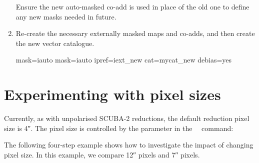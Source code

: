 \begin{enumerate}
  Ensure the new auto-masked co-add is used in place of the old one to
  define any new masks needed in future.

\begin{terminalv}
\end{terminalv}

\item Re-create the necessary externally masked maps and co-adds, and
  then create the new vector catalogue.

\begin{terminalv}
     mask=iauto
     mask=iauto ipref=iext_new cat=mycat_new debias=yes
\end{terminalv}
\end{enumerate}


\section{Experimenting with pixel sizes}

Currently, as with unpolarised SCUBA-2 reductions, the default
reduction pixel size is 4\si{\arcsecond}.  The pixel size is controlled by the
 parameter in the \smurf\ \poltwomap\ command:

\begin{terminalv}
\end{terminalv}


The following four-step example shows how to investigate the impact of
changing pixel size.  In this example, we compare 12\si{\arcsecond}
pixels and 7\si{\arcsecond} pixels.

